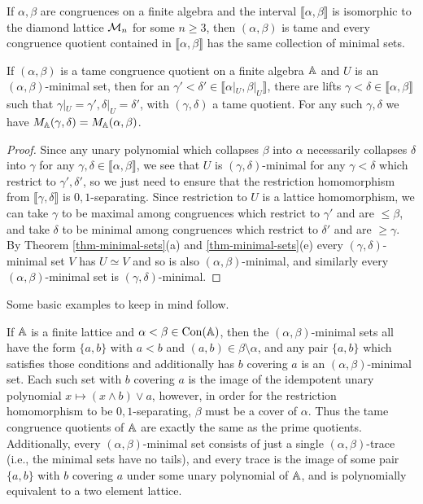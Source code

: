 \begin{appendices}
\begin{cor} If $\alpha,\beta$ are congruences on a finite algebra and the interval $\llbracket \alpha, \beta \rrbracket$ is isomorphic to the diamond lattice $\mathcal{M}_n$ for some $n \ge 3$, then $(\alpha, \beta)$ is tame and every congruence quotient contained in $\llbracket \alpha, \beta \rrbracket$ has the same collection of minimal sets.
\end{cor}

\begin{prop} If $(\alpha,\beta)$ is a tame congruence quotient on a finite algebra $\mathbb{A}$ and $U$ is an $(\alpha,\beta)$-minimal set, then for an $\gamma' < \delta' \in \llbracket \alpha|_U ,\beta|_U \rrbracket$, there are lifts $\gamma < \delta \in \llbracket \alpha, \beta \rrbracket$ such that $\gamma|_U = \gamma', \delta|_U = \delta'$, with $(\gamma,\delta)$ a tame quotient. For any such $\gamma, \delta$ we have $M_{\mathbb{A}}(\gamma,\delta) = M_{\mathbb{A}}(\alpha,\beta)$.
\end{prop}
\begin{proof} Since any unary polynomial which collapses $\beta$ into $\alpha$ necessarily collapses $\delta$ into $\gamma$ for any $\gamma,\delta \in \llbracket \alpha, \beta \rrbracket$, we see that $U$ is $(\gamma,\delta)$-minimal for any $\gamma < \delta$ which restrict to $\gamma', \delta'$, so we just need to ensure that the restriction homomorphism from $\llbracket \gamma, \delta \rrbracket$ is $0,1$-separating. Since restriction to $U$ is a lattice homomorphism, we can take $\gamma$ to be maximal among congruences which restrict to $\gamma'$ and are $\le \beta$, and take $\delta$ to be minimal among congruences which restrict to $\delta'$ and are $\ge \gamma$. By Theorem \ref{thm-minimal-sets}(a) and \ref{thm-minimal-sets}(e) every $(\gamma,\delta)$-minimal set $V$ has $U \simeq V$ and so is also $(\alpha,\beta)$-minimal, and similarly every $(\alpha,\beta)$-minimal set is $(\gamma,\delta)$-minimal.
\end{proof}

Some basic examples to keep in mind follow.

\begin{ex} If $\mathbb{A}$ is a finite lattice and $\alpha < \beta \in \operatorname{Con}(\mathbb{A})$, then the $(\alpha,\beta)$-minimal sets all have the form $\{a,b\}$ with $a < b$ and $(a,b) \in \beta\setminus \alpha$, and any pair $\{a,b\}$ which satisfies those conditions and additionally has $b$ covering $a$ is an $(\alpha,\beta)$-minimal set. Each such set with $b$ covering $a$ is the image of the idempotent unary polynomial $x \mapsto (x \wedge b) \vee a$, however, in order for the restriction homomorphism to be $0,1$-separating, $\beta$ must be a cover of $\alpha$. Thus the tame congruence quotients of $\mathbb{A}$ are exactly the same as the prime quotients. Additionally, every $(\alpha,\beta)$-minimal set consists of just a single $(\alpha,\beta)$-trace (i.e., the minimal sets have no tails), and every trace is the image of some pair $\{a,b\}$ with $b$ covering $a$ under some unary polynomial of $\mathbb{A}$, and is polynomially equivalent to a two element lattice.
\end{ex}


\end{appendices}
